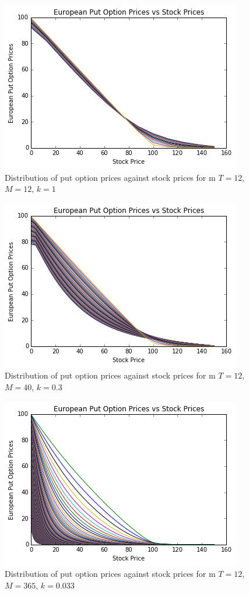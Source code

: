 \documentclass[paper=a4, fontsize=10pt]{article} %
\begin{document}
\begin{figure}[h!]
\center
\includegraphics[scale=0.8]{vary1212.png}
\caption{Distribution of put option prices against stock prices for m $T=12$, $M=12$, $k=1$}
\end{figure}

\begin{figure}[h!]
\center
\includegraphics[scale=0.8]{vary1240.png}
\caption{Distribution of put option prices against stock prices for m $T=12$, $M=40$, $k=0.3$}
\end{figure}

\begin{figure}[h!]
\center
\includegraphics[scale=0.8]{vary12365.png}
\caption{Distribution of put option prices against stock prices for m $T=12$, $M=365$, $k=0.033$}
\end{figure}
\end{document}
